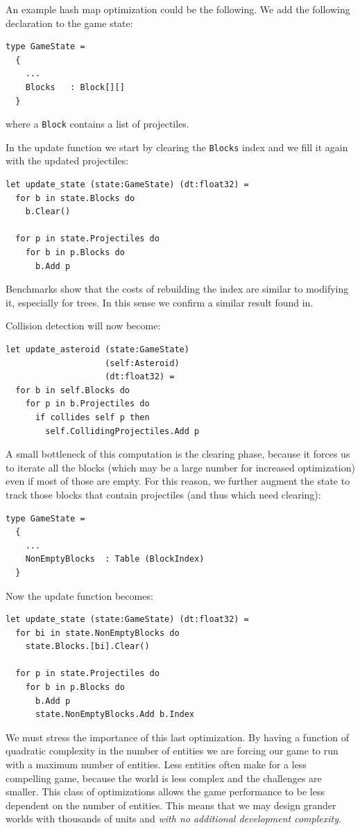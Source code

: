 An example hash map optimization could be the following. We add the following declaration to the game state:

\begin{lstlisting}
type GameState = 
  {
    ...
    Blocks   : Block[][]
  }
\end{lstlisting}

where a \texttt{Block} contains a list of projectiles.

In the update function we start by clearing the \texttt{Blocks} index and we fill it again with the updated projectiles:

\begin{lstlisting}
let update_state (state:GameState) (dt:float32) =
  for b in state.Blocks do
    b.Clear()
  
  for p in state.Projectiles do
    for b in p.Blocks do
      b.Add p
\end{lstlisting}

Benchmarks show that the costs of rebuilding the index are similar to modifying it, especially for trees. In this sense we confirm a similar result found in.

Collision detection will now become:

\begin{lstlisting}
let update_asteroid (state:GameState) 
                    (self:Asteroid) 
                    (dt:float32) =
  for b in self.Blocks do
    for p in b.Projectiles do
      if collides self p then
        self.CollidingProjectiles.Add p
\end{lstlisting}

A small bottleneck of this computation is the clearing phase, because it forces us to iterate all the blocks (which may be a large number for increased optimization) even if most of those are empty. For this reason, we further augment the state to track those blocks that contain projectiles (and thus which need clearing):

\begin{lstlisting}
type GameState = 
  {
    ...
    NonEmptyBlocks  : Table (BlockIndex)
  }
\end{lstlisting}

Now the update function becomes:

\begin{lstlisting}
let update_state (state:GameState) (dt:float32) =
  for bi in state.NonEmptyBlocks do
    state.Blocks.[bi].Clear()
  
  for p in state.Projectiles do
    for b in p.Blocks do
      b.Add p
      state.NonEmptyBlocks.Add b.Index
\end{lstlisting}

We must stress the importance of this last optimization. By having a function of quadratic complexity in the number of entities we are forcing our game to run with a maximum number of entities. Less entities often make for a less compelling game, because the world is less complex and the challenges are smaller. This class of optimizations allows the game performance to be less dependent on the number of entities. This means that we may design grander worlds with thousands of units and \textit{with no additional development complexity}.